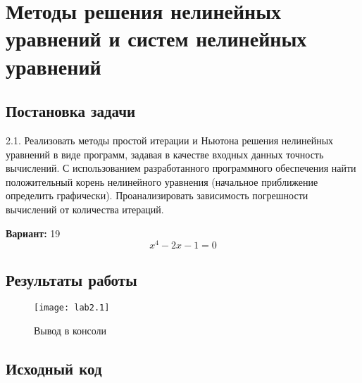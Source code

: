 \section{Методы решения нелинейных уравнений и систем нелинейных уравнений}

\subsection{Постановка задачи}
2.1. Реализовать методы простой итерации и Ньютона решения нелинейных уравнений в виде программ, задавая в качестве входных данных точность вычислений. С использованием разработанного программного обеспечения найти положительный корень нелинейного уравнения (начальное приближение определить графически). Проанализировать зависимость погрешности вычислений от количества итераций. 

{\bfseries Вариант:} 19
    \begin{equation}
        x^4 - 2x - 1 = 0
    \end{equation}
\pagebreak

\subsection{Результаты работы}
\begin{figure}[h!]
\centering
\texttt{[image: lab2.1]}
\caption{Вывод в консоли}
\end{figure}


\subsection{Исходный код}

\pagebreak

